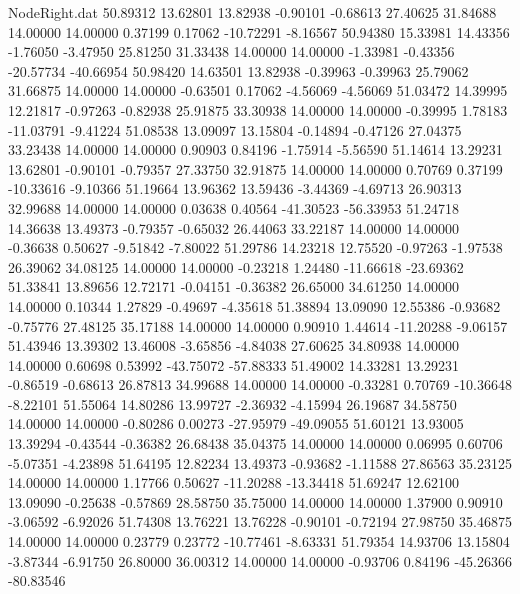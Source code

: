 \begin{filecontents}{NodeRight.dat}
  50.89312   13.62801   13.82938    -0.90101   -0.68613   27.40625   31.84688   14.00000   14.00000    0.37199    0.17062  -10.72291   -8.16567
  50.94380   15.33981   14.43356    -1.76050   -3.47950   25.81250   31.33438   14.00000   14.00000   -1.33981   -0.43356  -20.57734  -40.66954
  50.98420   14.63501   13.82938    -0.39963   -0.39963   25.79062   31.66875   14.00000   14.00000   -0.63501    0.17062   -4.56069   -4.56069
  51.03472   14.39995   12.21817    -0.97263   -0.82938   25.91875   33.30938   14.00000   14.00000   -0.39995    1.78183  -11.03791   -9.41224
  51.08538   13.09097   13.15804    -0.14894   -0.47126   27.04375   33.23438   14.00000   14.00000    0.90903    0.84196   -1.75914   -5.56590
  51.14614   13.29231   13.62801    -0.90101   -0.79357   27.33750   32.91875   14.00000   14.00000    0.70769    0.37199  -10.33616   -9.10366
  51.19664   13.96362   13.59436    -3.44369   -4.69713   26.90313   32.99688   14.00000   14.00000    0.03638    0.40564  -41.30523  -56.33953
  51.24718   14.36638   13.49373    -0.79357   -0.65032   26.44063   33.22187   14.00000   14.00000   -0.36638    0.50627   -9.51842   -7.80022
  51.29786   14.23218   12.75520    -0.97263   -1.97538   26.39062   34.08125   14.00000   14.00000   -0.23218    1.24480  -11.66618  -23.69362
  51.33841   13.89656   12.72171    -0.04151   -0.36382   26.65000   34.61250   14.00000   14.00000    0.10344    1.27829   -0.49697   -4.35618
  51.38894   13.09090   12.55386    -0.93682   -0.75776   27.48125   35.17188   14.00000   14.00000    0.90910    1.44614  -11.20288   -9.06157
  51.43946   13.39302   13.46008    -3.65856   -4.84038   27.60625   34.80938   14.00000   14.00000    0.60698    0.53992  -43.75072  -57.88333
  51.49002   14.33281   13.29231    -0.86519   -0.68613   26.87813   34.99688   14.00000   14.00000   -0.33281    0.70769  -10.36648   -8.22101
  51.55064   14.80286   13.99727    -2.36932   -4.15994   26.19687   34.58750   14.00000   14.00000   -0.80286    0.00273  -27.95979  -49.09055
  51.60121   13.93005   13.39294    -0.43544   -0.36382   26.68438   35.04375   14.00000   14.00000    0.06995    0.60706   -5.07351   -4.23898
  51.64195   12.82234   13.49373    -0.93682   -1.11588   27.86563   35.23125   14.00000   14.00000    1.17766    0.50627  -11.20288  -13.34418
  51.69247   12.62100   13.09090    -0.25638   -0.57869   28.58750   35.75000   14.00000   14.00000    1.37900    0.90910   -3.06592   -6.92026
  51.74308   13.76221   13.76228    -0.90101   -0.72194   27.98750   35.46875   14.00000   14.00000    0.23779    0.23772  -10.77461   -8.63331
  51.79354   14.93706   13.15804    -3.87344   -6.91750   26.80000   36.00312   14.00000   14.00000   -0.93706    0.84196  -45.26366  -80.83546

\end{filecontents}
